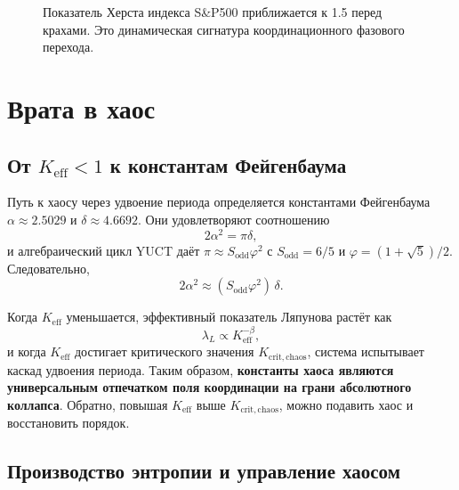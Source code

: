 \documentclass[12pt,a4paper]{article}
\newcommand{\Keff}{K_{\mathrm{eff}}}
\begin{document}
	\begin{figure}[H]
		\centering
		\caption{Показатель Херста индекса S\&P500 приближается к 1.5 перед крахами.
			Это динамическая сигнатура координационного фазового перехода.}
		\label{fig:hurst}
	\end{figure}
	
	\section{Врата в хаос}
	
	\subsection{От $\Keff < 1$ к константам Фейгенбаума}
	
	Путь к хаосу через удвоение периода определяется константами Фейгенбаума
	$\alpha \approx 2.5029$ и $\delta \approx 4.6692$. Они удовлетворяют соотношению
	\[
	2\alpha^2 = \pi \delta,
	\]
	и алгебраический цикл YUCT даёт $\pi \approx S_{\mathrm{odd}}\varphi^2$ с
	$S_{\mathrm{odd}}=6/5$ и $\varphi = (1+\sqrt{5})/2$. Следовательно,
	\[
	2\alpha^2 \approx (S_{\mathrm{odd}}\varphi^2)\,\delta.
	\]
	
	Когда $\Keff$ уменьшается, эффективный показатель Ляпунова растёт как
	\[
	\lambda_L \propto \Keff^{-\beta},
	\]
	и когда $\Keff$ достигает критического значения $K_{\mathrm{crit,chaos}}$, система
	испытывает каскад удвоения периода. Таким образом, \textbf{константы хаоса являются
		универсальным отпечатком поля координации на грани абсолютного коллапса}.
	Обратно, повышая $\Keff$ выше $K_{\mathrm{crit,chaos}}$, можно подавить хаос
	и восстановить порядок.
	
	\subsection{Производство энтропии и управление хаосом}
	
\end{document}
